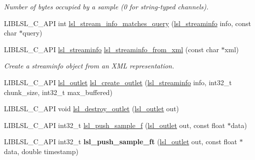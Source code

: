 \begin{DoxyCompactItemize}
\begin{DoxyCompactList}\small\item\em Number of bytes occupied by a sample (0 for string-\/typed channels). \end{DoxyCompactList}\item 
L\+I\+B\+L\+S\+L\+\_\+\+C\+\_\+\+A\+PI int \hyperlink{namespacelsl_a5c10ba1783b34bd0b3f048ac4cb5fe5e}{lsl\+\_\+stream\+\_\+info\+\_\+matches\+\_\+query} (\hyperlink{namespacelsl_aa0a9ce9956061679949daa2e35aae2e8}{lsl\+\_\+streaminfo} info, const char $\ast$query)
\item 
\mbox{\label{namespacelsl_a2cf7fb16bf4029ca632fa5dab930de47}} 
L\+I\+B\+L\+S\+L\+\_\+\+C\+\_\+\+A\+PI \hyperlink{namespacelsl_aa0a9ce9956061679949daa2e35aae2e8}{lsl\+\_\+streaminfo} \hyperlink{namespacelsl_a2cf7fb16bf4029ca632fa5dab930de47}{lsl\+\_\+streaminfo\+\_\+from\+\_\+xml} (const char $\ast$xml)
\begin{DoxyCompactList}\small\item\em Create a streaminfo object from an X\+ML representation. \end{DoxyCompactList}\item 
L\+I\+B\+L\+S\+L\+\_\+\+C\+\_\+\+A\+PI \hyperlink{namespacelsl_abcf512b0f66dacf86c10b165995fd50b}{lsl\+\_\+outlet} \hyperlink{namespacelsl_a4c92219e56eec896266a36ae58426d4b}{lsl\+\_\+create\+\_\+outlet} (\hyperlink{namespacelsl_aa0a9ce9956061679949daa2e35aae2e8}{lsl\+\_\+streaminfo} info, int32\+\_\+t chunk\+\_\+size, int32\+\_\+t max\+\_\+buffered)
\item 
L\+I\+B\+L\+S\+L\+\_\+\+C\+\_\+\+A\+PI void \hyperlink{namespacelsl_aa39980eac53711feece8bfc3b50d2b24}{lsl\+\_\+destroy\+\_\+outlet} (\hyperlink{namespacelsl_abcf512b0f66dacf86c10b165995fd50b}{lsl\+\_\+outlet} out)
\item 
L\+I\+B\+L\+S\+L\+\_\+\+C\+\_\+\+A\+PI int32\+\_\+t \hyperlink{namespacelsl_a001aa3637915875c44c379c07c55fb3a}{lsl\+\_\+push\+\_\+sample\+\_\+f} (\hyperlink{namespacelsl_abcf512b0f66dacf86c10b165995fd50b}{lsl\+\_\+outlet} out, const float $\ast$data)
\item 
\mbox{\label{namespacelsl_ade95641430ee28ac2bbcf888f572d34f}} 
L\+I\+B\+L\+S\+L\+\_\+\+C\+\_\+\+A\+PI int32\+\_\+t {\bfseries lsl\+\_\+push\+\_\+sample\+\_\+ft} (\hyperlink{namespacelsl_abcf512b0f66dacf86c10b165995fd50b}{lsl\+\_\+outlet} out, const float $\ast$data, double timestamp)
\item 

\end{DoxyCompactItemize}
